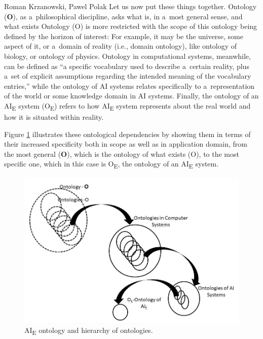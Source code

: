 \begin{artengenv2auth}{Roman Krzanowski, Pawel Polak}
Let us now put these things together. Ontology (\textbf{O}), as a~philosophical discipline, asks what is, in a~most general sense, and what exists Ontology (O) is more restricted with the scope of this ontology being defined by the horizon of interest: For example, it may be the universe, some aspect of it, or a~domain of reality (i.e., domain ontology), like ontology of biology, or ontology of physics. Ontology in computational systems, meanwhile, can be defined as ``a specific vocabulary used to describe a~certain reality, plus a~set of explicit assumptions regarding the intended meaning of the vocabulary entries,'' while the ontology of AI systems relates specifically to a~representation of the world or some knowledge domain in AI systems. Finally, the ontology of an AI\textsubscript{E} system (O\textsubscript{E}) refers to how AI\textsubscript{E} system represents about the real world and how it is situated within reality.

Figure \ref{krz-ill1} illustrates these ontological dependencies by showing them in terms of their increased specificity both in scope as well as in application domain, from the most general (\textbf{O}), which is the ontology of what exists (O), to the most specific one, which in this case is O\textsubscript{E}, the ontology of an AI\textsubscript{E} system.




\begin{figure}[htp]
 \begin{center}
 \includegraphics[width=.9\textwidth]{ART_Krzanowski_Polak/Ontology2200B_pu.jpg}%
 \end{center}%
 \caption{AI\textsubscript{E} ontology and hierarchy of ontologies.}\label{krz-ill1}
\end{figure}



\end{artengenv2auth}
